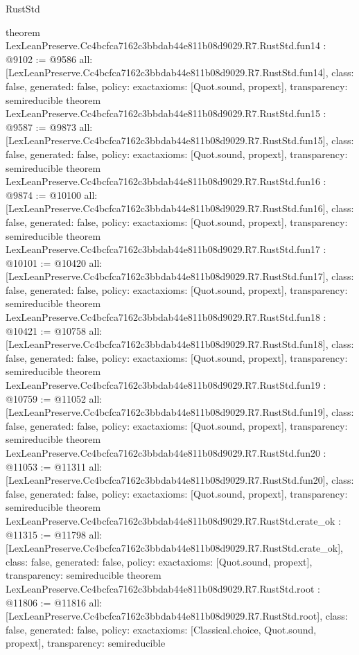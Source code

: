 \begin{lexlean}{RustStd}
\begin{coremodule}
{}
theorem LexLeanPreserve.Cc4bcfca7162c3bbdab44e811b08d9029.R7.RustStd.fun14 : @9102 := @9586 {
  all: [LexLeanPreserve.Cc4bcfca7162c3bbdab44e811b08d9029.R7.RustStd.fun14],
  class: false,
  generated: false,
  policy: exact{axioms: [Quot.sound, propext]},
  transparency: semireducible
}
theorem LexLeanPreserve.Cc4bcfca7162c3bbdab44e811b08d9029.R7.RustStd.fun15 : @9587 := @9873 {
  all: [LexLeanPreserve.Cc4bcfca7162c3bbdab44e811b08d9029.R7.RustStd.fun15],
  class: false,
  generated: false,
  policy: exact{axioms: [Quot.sound, propext]},
  transparency: semireducible
}
theorem LexLeanPreserve.Cc4bcfca7162c3bbdab44e811b08d9029.R7.RustStd.fun16 : @9874 := @10100 {
  all: [LexLeanPreserve.Cc4bcfca7162c3bbdab44e811b08d9029.R7.RustStd.fun16],
  class: false,
  generated: false,
  policy: exact{axioms: [Quot.sound, propext]},
  transparency: semireducible
}
theorem LexLeanPreserve.Cc4bcfca7162c3bbdab44e811b08d9029.R7.RustStd.fun17 : @10101 := @10420 {
  all: [LexLeanPreserve.Cc4bcfca7162c3bbdab44e811b08d9029.R7.RustStd.fun17],
  class: false,
  generated: false,
  policy: exact{axioms: [Quot.sound, propext]},
  transparency: semireducible
}
theorem LexLeanPreserve.Cc4bcfca7162c3bbdab44e811b08d9029.R7.RustStd.fun18 : @10421 := @10758 {
  all: [LexLeanPreserve.Cc4bcfca7162c3bbdab44e811b08d9029.R7.RustStd.fun18],
  class: false,
  generated: false,
  policy: exact{axioms: [Quot.sound, propext]},
  transparency: semireducible
}
theorem LexLeanPreserve.Cc4bcfca7162c3bbdab44e811b08d9029.R7.RustStd.fun19 : @10759 := @11052 {
  all: [LexLeanPreserve.Cc4bcfca7162c3bbdab44e811b08d9029.R7.RustStd.fun19],
  class: false,
  generated: false,
  policy: exact{axioms: [Quot.sound, propext]},
  transparency: semireducible
}
theorem LexLeanPreserve.Cc4bcfca7162c3bbdab44e811b08d9029.R7.RustStd.fun20 : @11053 := @11311 {
  all: [LexLeanPreserve.Cc4bcfca7162c3bbdab44e811b08d9029.R7.RustStd.fun20],
  class: false,
  generated: false,
  policy: exact{axioms: [Quot.sound, propext]},
  transparency: semireducible
}
theorem LexLeanPreserve.Cc4bcfca7162c3bbdab44e811b08d9029.R7.RustStd.crate_ok : @11315 := @11798 {
  all: [LexLeanPreserve.Cc4bcfca7162c3bbdab44e811b08d9029.R7.RustStd.crate_ok],
  class: false,
  generated: false,
  policy: exact{axioms: [Quot.sound, propext]},
  transparency: semireducible
}
theorem LexLeanPreserve.Cc4bcfca7162c3bbdab44e811b08d9029.R7.RustStd.root : @11806 := @11816 {
  all: [LexLeanPreserve.Cc4bcfca7162c3bbdab44e811b08d9029.R7.RustStd.root],
  class: false,
  generated: false,
  policy: exact{axioms: [Classical.choice, Quot.sound, propext]},
  transparency: semireducible
}


\end{coremodule}
\end{lexlean}
